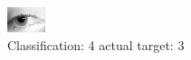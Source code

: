 \begin{figure}[h!]
\begin{center}
\includegraphics[width=0.60\columnwidth]{figures/ID1414_class_4_target_3.png}
\end{center}
\caption{ Classification: 4 actual target: 3}
\label{fig:ID1414_class_4_target_3}
\end{figure}
